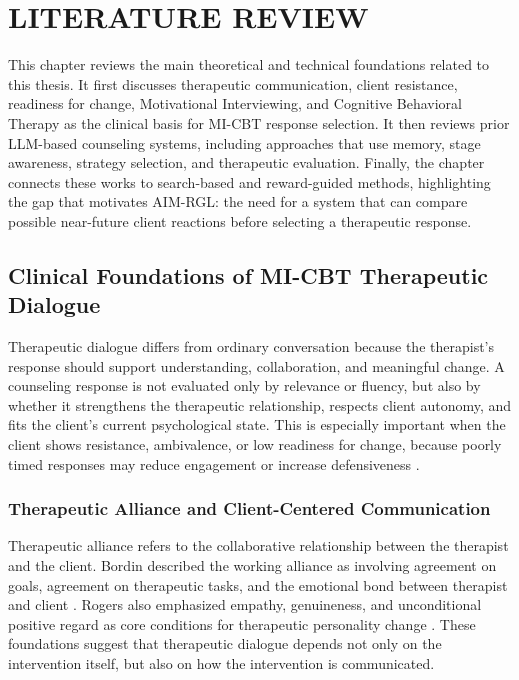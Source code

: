 \setlength{\footskip}{8mm}

\chapter{LITERATURE REVIEW}

This chapter reviews the main theoretical and technical foundations related to this thesis. It first discusses therapeutic communication, client resistance, readiness for change, Motivational Interviewing, and Cognitive Behavioral Therapy as the clinical basis for MI-CBT response selection. It then reviews prior LLM-based counseling systems, including approaches that use memory, stage awareness, strategy selection, and therapeutic evaluation. Finally, the chapter connects these works to search-based and reward-guided methods, highlighting the gap that motivates AIM-RGL: the need for a system that can compare possible near-future client reactions before selecting a therapeutic response.

\section{Clinical Foundations of MI-CBT Therapeutic Dialogue}

Therapeutic dialogue differs from ordinary conversation because the therapist's response should support understanding, collaboration, and meaningful change. A counseling response is not evaluated only by relevance or fluency, but also by whether it strengthens the therapeutic relationship, respects client autonomy, and fits the client's current psychological state. This is especially important when the client shows resistance, ambivalence, or low readiness for change, because poorly timed responses may reduce engagement or increase defensiveness \cite{patterson1985therapist,patterson1994functional,beutler2002resistance}.

\subsection{Therapeutic Alliance and Client-Centered Communication}

Therapeutic alliance refers to the collaborative relationship between the therapist and the client. Bordin described the working alliance as involving agreement on goals, agreement on therapeutic tasks, and the emotional bond between therapist and client \cite{bordin1979alliance}. Rogers also emphasized empathy, genuineness, and unconditional positive regard as core conditions for therapeutic personality change \cite{rogers1957necessary}. These foundations suggest that therapeutic dialogue depends not only on the intervention itself, but also on how the intervention is communicated.

